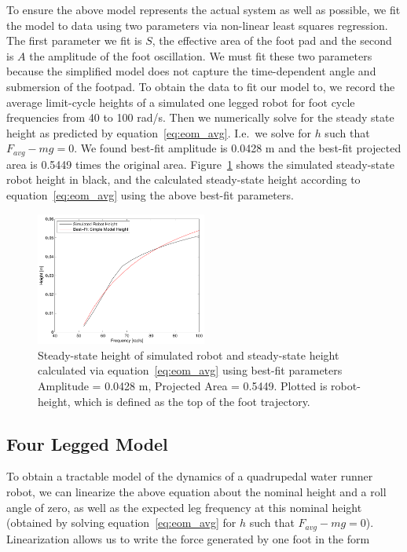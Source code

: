 To ensure the above model represents the actual system as well as possible, we fit the model to data using two parameters via non-linear least squares regression. The first parameter we fit is $S$, the effective area of the foot pad and the second is $A$ the amplitude of the foot oscillation. We must fit these two parameters because the simplified model does not capture the time-dependent angle and submersion of the footpad. To obtain the data to fit our model to, we record the average limit-cycle heights of a simulated one legged robot for foot cycle frequencies from 40 to 100 rad/s. Then we numerically solve for the steady state height as predicted by equation~\ref{eq:eom_avg}. I.e.\ we solve for $h$ such that $F_{avg} - mg = 0$. We found best-fit amplitude is 0.0428 m and the best-fit projected area is 0.5449 times the original area. Figure~\ref{fig:fitheight} shows the simulated steady-state robot height in black, and the calculated steady-state height according to equation~\ref{eq:eom_avg} using the above best-fit parameters.

\begin{figure}[htb]
	\centering
	\includegraphics[width = 0.5\textwidth]{figures/fitParamsV2.pdf}
	\caption{Steady-state height of simulated robot and steady-state height calculated via equation~\ref{eq:eom_avg} using best-fit parameters Amplitude = 0.0428 m, Projected Area = 0.5449. Plotted is robot-height, which is defined as the top of the foot trajectory.} 
    \label{fig:fitheight}
\end{figure}

\subsection{Four Legged Model}
To obtain a tractable model of the dynamics of a quadrupedal water runner robot, we can linearize the above equation about the nominal height and a roll angle of zero, as well as the expected leg frequency at this nominal height (obtained by solving equation~\ref{eq:eom_avg} for $h$ such that $F_{avg} - mg = 0$). Linearization allows us to write the force generated by one foot in the form

